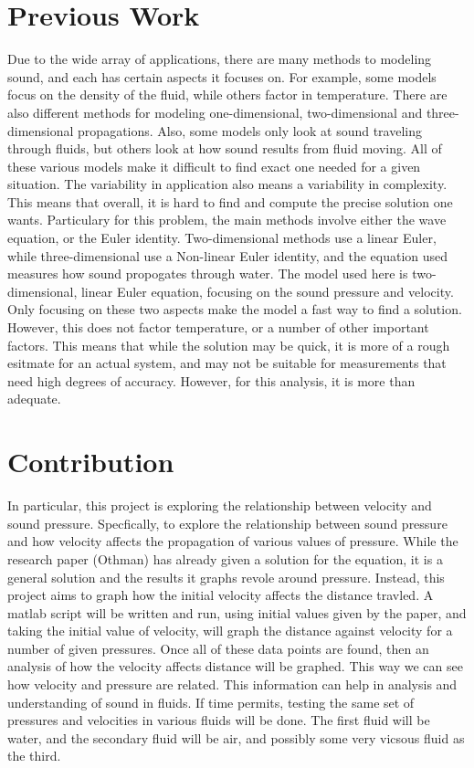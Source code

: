 \documentclass{article}
\begin{document}
\section{Previous Work}
Due to the wide array of applications, there are many methods to modeling sound, and each has certain
aspects it focuses on. For example, some models focus on the density of the fluid, while others factor
in temperature. There are also different methods for modeling one-dimensional, two-dimensional and
three-dimensional propagations. Also, some models only look at sound traveling through fluids, but
others look at how sound results from fluid moving. All of these various models make it difficult to 
find exact one needed for a given situation. The variability in application also means a variability 
in complexity. This means that overall, it is hard to find and compute the precise solution one wants.
Particulary for this problem, the main methods involve either the wave equation, or the Euler identity. 
Two-dimensional methods use a linear Euler, while three-dimensional use a Non-linear Euler identity, 
and the equation used measures how sound propogates through water. The model used here is two-dimensional,
linear Euler equation, focusing on the sound pressure and velocity. Only focusing on these two aspects
make the model a fast way to find a solution. However, this does not factor temperature, or a number of 
other important factors. This means that while the solution may be quick, it is more of a rough esitmate
for an actual system, and may not be suitable for measurements that need high degrees of accuracy.
However, for this analysis, it is more than adequate.

\section{Contribution}
In particular, this project is exploring the relationship between velocity and sound pressure. 
Specfically, to explore the relationship between sound pressure and how velocity affects the
propagation of various values of pressure. While the research paper (Othman) has already given a solution
for the equation, it is a general solution and the results it graphs revole around pressure. Instead,
this project aims to graph how the initial velocity affects the distance travled. A matlab script
will be written and run, using initial values given by the paper, and taking the initial value of velocity,
will graph the distance against velocity for a number of given pressures. Once all of these data points are
found, then an analysis of how the velocity affects distance will be graphed. This way we can see how velocity
and pressure are related. This information can help in analysis and understanding of sound in fluids.
If time permits, testing the same set of pressures and velocities in various fluids will be done. The first
fluid will be water, and the secondary fluid will be air, and possibly some very vicsous fluid as the third.\\
\end{document}
